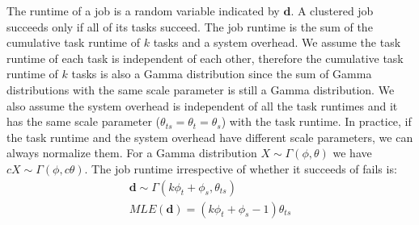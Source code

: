 \documentclass{IOS-Book-Article}
\begin{document}
The runtime of a job is a random variable indicated by $\bm d$. A clustered job succeeds only if all of its tasks succeed. The job runtime is the sum of the cumulative task runtime of $k$ tasks and a system overhead. We assume the task runtime of each task is independent of each other, therefore the cumulative task runtime of $k$ tasks is also a Gamma distribution since the sum of Gamma distributions with the same scale parameter is still a Gamma distribution. We also assume the system overhead is independent of all the task runtimes and it has the same scale parameter ($\theta_{ts}=\theta_{t}=\theta_{s}$) with the task runtime. In practice, if the task runtime and the system overhead have different scale parameters, we can always normalize them. For a Gamma distribution $X\sim\Gamma(\phi,\theta)$ we have $cX\sim\Gamma(\phi, c\theta)$. 
The job runtime irrespective of whether it succeeds of fails is:
\begin{eqnarray}
\displaystyle
\bm{d}\sim\Gamma(k\phi_{t}+\phi_{s}, \theta_{ts})\\
MLE(\bm{d})=\displaystyle{(k\phi_t+\phi_s - 1) }{\theta_{ts}}
\label{eq:N}
\end{eqnarray}

\end{document}
